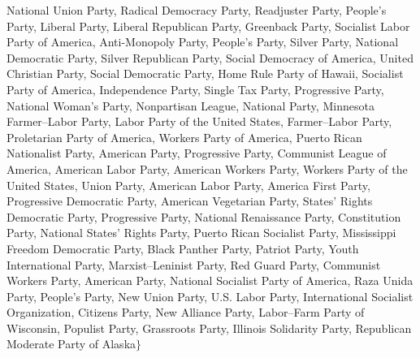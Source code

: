 \documentclass{classrep}
\begin{document}
National Union Party, Radical Democracy Party, Readjuster Party, People's Party, Liberal Party, Liberal Republican Party, Greenback Party, Socialist Labor Party of America, Anti-Monopoly Party, People's Party, Silver Party, National Democratic Party, Silver Republican Party, Social Democracy of America, United Christian Party, Social Democratic Party, Home Rule Party of Hawaii, Socialist Party of America, Independence Party, Single Tax Party, Progressive Party, National Woman's Party, Nonpartisan League, National Party, Minnesota Farmer–Labor Party, Labor Party of the United States, Farmer–Labor Party, Proletarian Party of America, Workers Party of America, Puerto Rican Nationalist Party, American Party, Progressive Party, Communist League of America, American Labor Party, American Workers Party, Workers Party of the United States, Union Party, American Labor Party, America First Party, Progressive Democratic Party, American Vegetarian Party, States' Rights Democratic Party, Progressive Party, National Renaissance Party, Constitution Party, National States' Rights Party, Puerto Rican Socialist Party, Mississippi Freedom Democratic Party, Black Panther Party, Patriot Party, Youth International Party, Marxist–Leninist Party, Red Guard Party, Communist Workers Party, American Party, National Socialist Party of America, Raza Unida Party, People's Party, New Union Party, U.S. Labor Party, International Socialist Organization, Citizens Party, New Alliance Party, Labor–Farm Party of Wisconsin, Populist Party, Grassroots Party, Illinois Solidarity Party, Republican Moderate Party of Alaska$\} $
\end{document}
